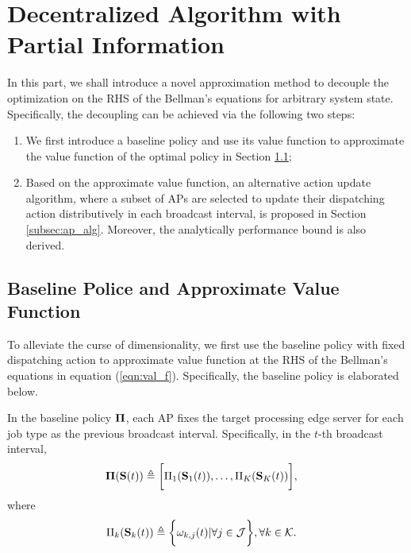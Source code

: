 \section{Decentralized Algorithm with Partial Information}
\label{sec:algorithm}

In this part, we shall introduce a novel approximation method to decouple the optimization on the RHS of the Bellman's equations for arbitrary system state.
Specifically, the decoupling can be achieved via the following two steps:
\begin{enumerate}
    \item We first introduce a baseline policy and use its value function to approximate the value function of the optimal policy in Section \ref{subsec:baseline};
    \item Based on the approximate value function, an alternative action update algorithm, where a subset of APs are selected to update their dispatching action distributively in each broadcast interval, is proposed in Section \ref{subsec:ap_alg}.
    Moreover, the analytically performance bound is also derived.
\end{enumerate}

\subsection{Baseline Police and Approximate Value Function}
\label{subsec:baseline}
To alleviate the curse of dimensionality, we first use the baseline policy with fixed dispatching action to approximate value function at the RHS of the Bellman's equations in equation (\ref{eqn:val_f}).
Specifically, the baseline policy is elaborated below.

\begin{policy}
    In the baseline policy $\boldsymbol{\Pi}$, each AP fixes the target processing edge server for each job type as the previous broadcast interval. Specifically, in the $t$-th broadcast interval,
    \begin{align}
        \boldsymbol{\Pi}(\mathbf{S}(t)) &\triangleq \bigg[ \Pi_{1}(\mathbf{S}_{1}(t)), \dots, \Pi_{K}(\mathbf{S}_{K}(t)) \bigg],
    \end{align}
    where 
    \begin{align}
        \Pi_{k}(\mathbf{S}_{k}(t)) &\triangleq \bigg\{
            \omega_{k,j}(t) | \forall j\in\mathcal{J}
        \bigg\}, \forall k\in\mathcal{K}.
    \end{align}
\end{policy}

